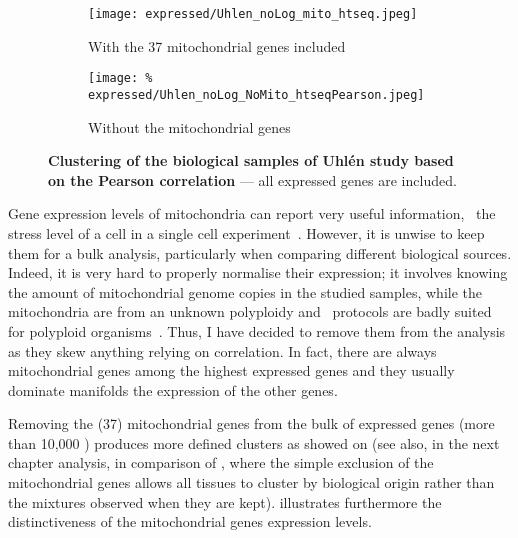 \begin{figure}[!htbp]
    \centering
    \begin{subfigure}[hp]{0.85\textwidth}
        \centering
        \texttt{[image: expressed/Uhlen\_noLog\_mito\_htseq.jpeg]}
        \caption{With the 37 mitochondrial genes included}\label{fig:withMito}
    \end{subfigure}

    \begin{subfigure}[hp]{0.85\textwidth}
        \centering
        \texttt{[image: \%
            expressed/Uhlen\_noLog\_NoMito\_htseqPearson.jpeg]}
        \caption{Without the mitochondrial genes}\label{fig:NoMito}
    \end{subfigure}
    \caption[Clustering of the biological samples of \uhlen\
    dataset based on the Pearson correlation]{\label{fig:MitoNomito}\textbf{Clustering
    of the biological samples of Uhlén study based on the Pearson correlation}
    --- all expressed genes are included.}
\end{figure}

Gene expression levels of mitochondria can report very useful information,
\eg\ the stress level of a cell in a single cell experiment~.
However, it is unwise to keep them for a bulk analysis, particularly when
comparing different biological sources.
Indeed, it is very hard to properly normalise their expression;
it involves knowing the amount of mitochondrial genome copies
in the studied samples, while the mitochondria are from an unknown polyploidy
and \Rnaseq\ protocols are badly suited for polyploid organisms~.
Thus, I have decided to remove them from the analysis as they skew anything relying
on correlation.
In fact, there are always mitochondrial genes among the highest expressed genes
and they usually dominate manifolds the expression of the other genes.\mybr\

Removing the (37) mitochondrial genes from the bulk of expressed genes
(more than 10,000 \pcgs) produces more defined clusters as showed on
\Cref{fig:MitoNomito}
(see also, in the next chapter analysis,
 in comparison of ,
where the simple exclusion of the mitochondrial genes allows all tissues
to cluster by biological origin rather than the mixtures observed
when they are kept).
 illustrates furthermore the distinctiveness
of the mitochondrial genes expression levels.\mybr\


